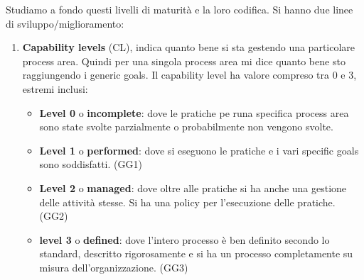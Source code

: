 Studiamo a fondo questi livelli di maturità e la loro codifica. Si hanno due
linee di sviluppo/miglioramento:
\begin{enumerate}
    \item \textbf{Capability levels} (CL), indica quanto bene si sta gestendo una
          particolare process area. Quindi per una singola process area mi dice quanto
          bene sto raggiungendo i generic goals. Il capability level ha valore compreso
          tra 0 e 3, estremi inclusi:
          \begin{itemize}
              \item \textbf{Level 0} o \textbf{incomplete}: dove le pratiche pe runa
                    specifica process area sono state svolte parzialmente o probabilmente
                    non vengono svolte.
              \item \textbf{Level 1} o \textbf{performed}: dove si eseguono le pratiche
                    e i vari specific goals sono soddisfatti. (GG1)
              \item \textbf{Level 2} o \textbf{managed}: dove oltre alle pratiche si
                    ha anche una gestione delle attività stesse. Si ha una policy per l'esecuzione
                    delle pratiche. (GG2)
              \item \textbf{level 3} o \textbf{defined}: dove l'intero processo è ben
                    definito secondo lo standard, descritto rigorosamente e si ha un processo
                    completamente su misura dell'organizzazione. (GG3)
          \end{itemize}


\end{enumerate}
